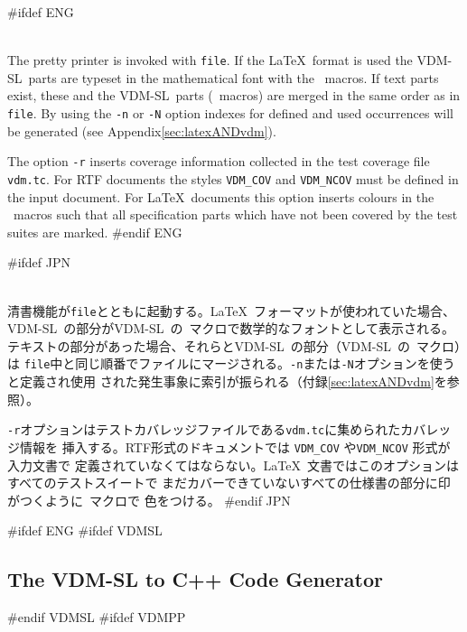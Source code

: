 \documentclass[\pformat,12pt]{article}
\newcommand{\vdmslpp}{VDM-SL}
\newcommand{\VdmSlPp}{\VdmSl}
\newcommand{\vdmslpp}{VDM++}
\DeclareRobustCommand{\VdmSlPp}{VDM++-\VdmSl}
\begin{document}
\begin{description} 

#ifdef ENG
\item[latex (l) \mbox{[{\tt -nNr}]} {\tt file}] \mbox{}\\
  The pretty printer is invoked with {\tt file}.  If the \LaTeX\ format is
  used the \vdmslpp\ 
  parts are typeset in the mathematical font with the \VdmSlPp\ 
  macros.  If text parts exist, these and the \vdmslpp\ parts
  (\VdmSlPp\ macros) are merged in the same order as in {\tt file}.
  By using the {\tt -n} or {\tt -N} option indexes for defined and
  used occurrences will be generated (see
  Appendix\ref{sec:latexANDvdm}).
  
  The option {\tt -r} inserts coverage information collected in the
test coverage file {\tt vdm.tc}. For RTF documents
the styles {\tt VDM\_COV} and {\tt VDM\_NCOV} must be defined in the
input document.  For \LaTeX\ documents this option inserts colours in
the \VdmSlPp\ macros such that all specification parts which have not
been covered by the test suites are marked.
#endif ENG

#ifdef JPN
\item[latex (l) \mbox{[{\tt -nNr}]} {\tt file}] \mbox{}\\
  清書機能が{\tt file}とともに起動する。\LaTeX\ フォーマットが使われていた場合、
  \vdmslpp\ の部分が\vdmslpp\ の\VdmSlPp\ マクロで数学的なフォントとして表示される。
  テキストの部分があった場合、それらと\vdmslpp\ の部分（\vdmslpp\ の\VdmSlPp\ マクロ）は
  {\tt file}中と同じ順番でファイルにマージされる。{\tt -n}または{\tt -N}オプションを使うと定義され使用
  された発生事象に索引が振られる（付録\ref{sec:latexANDvdm}を参照）。
  
{\tt -r}オプションはテストカバレッジファイルである{\tt vdm.tc}に集められたカバレッジ情報を
挿入する。RTF形式のドキュメントでは {\tt VDM\_COV} や{\tt VDM\_NCOV} 形式が入力文書で
定義されていなくてはならない。\LaTeX\ 文書ではこのオプションはすべてのテストスイートで
まだカバーできていないすべての仕様書の部分に印がつくように\VdmSlPp\ マクロで
色をつける。
#endif JPN

\end{description}


\newpage
#ifdef ENG
#ifdef VDMSL
\subsection{The VDM-SL to C++ Code Generator}\label{sec:cg}
#endif VDMSL
#ifdef VDMPP
\end{document}
